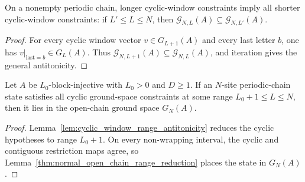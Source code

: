 \begin{lemma}%
    \label{lem:cyclic_window_range_antitonicity}
    \leanok
    On a nonempty periodic chain, longer cyclic-window constraints imply all
    shorter cyclic-window constraints: if $L'\le L\le N$, then
    $\mathcal G_{N,L}(A)\subseteq\mathcal G_{N,L'}(A)$.
\end{lemma}

\begin{proof}
    \leanok
    For every cyclic window vector $v\in G_{L+1}(A)$ and every last letter $b$,
    one has $v|_{\mathrm{last}=b}\in G_L(A)$. Thus
    $\mathcal G_{N,L+1}(A)\subseteq\mathcal G_{N,L}(A)$, and iteration gives
    the general antitonicity.
\end{proof}

\begin{lemma}%
    \label{thm:cyclic_normal_open_chain_range_reduction}
    \leanok
    Let $A$ be $L_0$-block-injective with $L_0>0$ and $D \ge 1$.
    If an $N$-site periodic-chain state satisfies all cyclic ground-space
    constraints at some range $L_0+1\le L\le N$, then it lies in the
    open-chain ground space $G_N(A)$.
\end{lemma}

\begin{proof}
    \leanok
    Lemma~\ref{lem:cyclic_window_range_antitonicity} reduces the cyclic
    hypotheses to range $L_0+1$. On every non-wrapping interval, the cyclic and
    contiguous restriction maps agree, so
    Lemma~\ref{thm:normal_open_chain_range_reduction} places the state in
    $G_N(A)$.
\end{proof}
